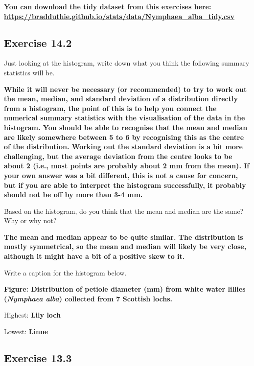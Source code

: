 \documentclass[
]{scrbook}
\begin{document}
\textbf{You can download the tidy dataset from this exercises here: \url{https://bradduthie.github.io/stats/data/Nymphaea_alba_tidy.csv}}

\hypertarget{exercise-14.2}{%
\subsection{Exercise 14.2}\label{exercise-14.2}}

Just looking at the histogram, write down what you think the following summary statistics will be.

\textbf{While it will never be necessary (or recommended) to try to work out the mean, median, and standard deviation of a distribution directly from a histogram, the point of this is to help you connect the numerical summary statistics with the visualisation of the data in the histogram. You should be able to recognise that the mean and median are likely somewhere between 5 to 6 by recognising this as the centre of the distribution. Working out the standard deviation is a bit more challenging, but the average deviation from the centre looks to be about 2 (i.e., most points are probably about 2 mm from the mean). If your own answer was a bit different, this is not a cause for concern, but if you are able to interpret the histogram successfully, it probably should not be off by more than 3-4 mm.}

Based on the histogram, do you think that the mean and median are the same? Why or why
not?

\textbf{The mean and median appear to be quite similar. The distribution is mostly symmetrical, so the mean and median will likely be very close, although it might have a bit of a positive skew to it.}

Write a caption for the histogram below.

\textbf{Figure: Distribution of petiole diameter (mm) from white water lillies (\emph{Nymphaea alba}) collected from 7 Scottish lochs.}

Highest: \textbf{Lily loch}

Lowest: \textbf{Linne}

\hypertarget{exercise-13.3}{%
\subsection{Exercise 13.3}\label{exercise-13.3}}
\end{document}
